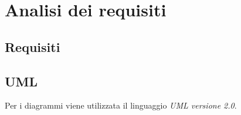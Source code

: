 \section{Analisi dei requisiti}

\subsection{Requisiti}

\subsection{UML}

Per i diagrammi viene utilizzata il linguaggio \emph{UML versione 2.0}.